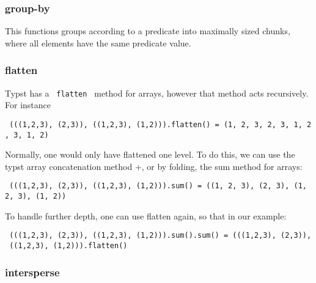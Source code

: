 \begin{Shaded}
\begin{Highlighting}[]
\end{Highlighting}
\end{Shaded}

\subsubsection{group-by}\label{group-by}

This functions groups according to a predicate into maximally sized
chunks, where all elements have the same predicate value.

\begin{Shaded}
\begin{Highlighting}[]
\end{Highlighting}
\end{Shaded}

\subsubsection{flatten}\label{flatten}

Typst has a \texttt{\ flatten\ } method for arrays, however that method
acts recursively. For instance

\texttt{\ (((1,2,3),\ (2,3)),\ ((1,2,3),\ (1,2))).flatten()\ =\ (1,\ 2,\ 3,\ 2,\ 3,\ 1,\ 2,\ 3,\ 1,\ 2)\ }

Normally, one would only have flattened one level. To do this, we can
use the typst array concatenation method +, or by folding, the sum
method for arrays:

\texttt{\ (((1,2,3),\ (2,3)),\ ((1,2,3),\ (1,2))).sum()\ =\ ((1,\ 2,\ 3),\ (2,\ 3),\ (1,\ 2,\ 3),\ (1,\ 2))\ }

To handle further depth, one can use flatten again, so that in our
example:

\texttt{\ (((1,2,3),\ (2,3)),\ ((1,2,3),\ (1,2))).sum().sum()\ =\ (((1,2,3),\ (2,3)),\ ((1,2,3),\ (1,2))).flatten()\ }

\subsubsection{intersperse}\label{intersperse}

